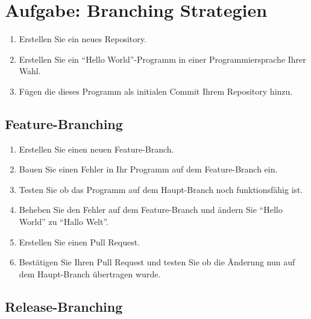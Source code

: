 
\section{Aufgabe: Branching Strategien}
\label{sec:task:task-branch}

\begin{enumerate}
    \item Erstellen Sie ein neues Repository.

    \item Erstellen Sie ein \enquote{Hello World}-Programm in einer Programmiersprache Ihrer Wahl.

    \item Fügen die dieses Programm als initialen Commit Ihrem Repository hinzu.

\end{enumerate}

\subsection{Feature\hyp Branching}

\begin{enumerate}
    \item Erstellen Sie einen neuen Feature\hyp Branch.

    \item Bauen Sie einen Fehler in Ihr Programm auf dem Feature\hyp Branch ein.
    
    \item Testen Sie ob das Programm auf dem Haupt\hyp Branch noch funktionsfähig ist.
    
    \item Beheben Sie den Fehler auf dem Feature\hyp Branch und ändern Sie \enquote{Hello World} zu \enquote{Hallo Welt}.
    
    \item Erstellen Sie einen Pull Request.
    
    \item Bestätigen Sie Ihren Pull Request und testen Sie ob die Änderung nun auf dem Haupt\hyp Branch übertragen wurde.
\end{enumerate}

\subsection{Release\hyp Branching}

